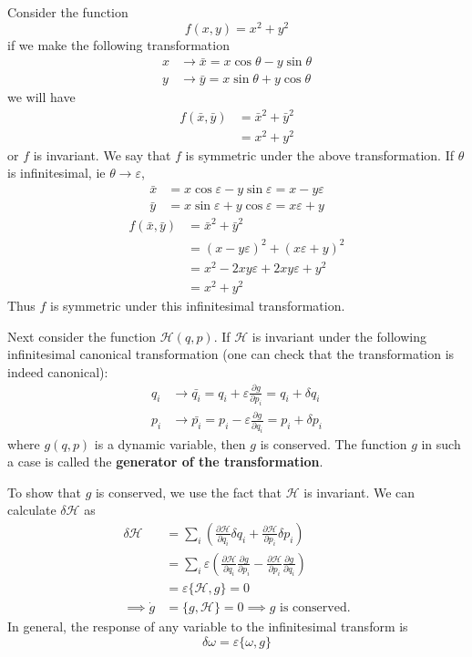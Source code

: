 \documentclass[12pt,a4paper]{report}
\newcommand{\parder}[2]{\frac{\partial#1}{\partial#2}}
\newcommand{\hamiltonian}{\mathcal{H}}
\begin{document}
Consider the function
\begin{equation*}
    f(x, y) = x^2+y^2
\end{equation*}
if we make the following transformation
\begin{align*}
    x &\to \bar{x} = x\cos\theta - y\sin\theta \\
    y &\to \bar{y} = x\sin\theta + y\cos\theta
\end{align*}
we will have
\begin{align*}
    f(\bar{x}, \bar{y}) &= \bar{x}^2 + \bar{y}^2 \\
    &= x^2+y^2
\end{align*}
or $f$ is invariant. We say that $f$ is symmetric under the above transformation. If $\theta$ is infinitesimal, ie $\theta\to\varepsilon$,
\begin{align*}
    \bar{x} &= x\cos\varepsilon - y\sin\varepsilon = x-y\varepsilon \\
    \bar{y} &= x\sin\varepsilon + y\cos\varepsilon = x\varepsilon + y
\end{align*}
\begin{align*}
    f(\bar{x}, \bar{y}) &= \bar{x}^2 + \bar{y}^2 \\
    &= (x-y\varepsilon)^2 + (x\varepsilon + y)^2 \\
    &= x^2 - 2xy\varepsilon + 2xy\varepsilon + y^2 \\
    &= x^2+y^2
\end{align*}
Thus $f$ is symmetric under this infinitesimal transformation.

Next consider the function $\hamiltonian(q, p)$. If $\hamiltonian$ is invariant under the following infinitesimal canonical transformation (one can check that the transformation is indeed canonical):
\begin{align*}
    q_i &\to \bar{q_i} = q_i + \varepsilon \parder{g}{p_i} = q_i + \delta q_i \\
    p_i &\to \bar{p_i} = p_i - \varepsilon \parder{g}{q_i} = p_i + \delta p_i
\end{align*}
where $g(q, p)$ is a dynamic variable, then $g$ is conserved. The function $g$ in such a case is called the \textbf{generator of the transformation}.

To show that $g$ is conserved, we use the fact that $\hamiltonian$ is invariant. We can calculate $\delta \hamiltonian$ as
\begin{align*}
    \delta\hamiltonian &= \sum_{i} \left( \parder{\hamiltonian}{q_i} \delta q_i + \parder{\hamiltonian}{p_i} \delta p_i \right) \\
    &= \sum_{i} \varepsilon\left( \parder{\hamiltonian}{q_i} \parder{g}{p_i} - \parder{\hamiltonian}{p_i} \parder{g}{q_i} \right) \\
    &= \varepsilon \{\hamiltonian, g\} = 0 \\
    \implies \dot{g} &= \{g, \hamiltonian\} = 0 \implies g \text{ is conserved.}
\end{align*}
In general, the response of any variable to the infinitesimal transform is
\begin{equation*}
    \delta\omega = \varepsilon\{\omega, g\}
\end{equation*}
\end{document}
